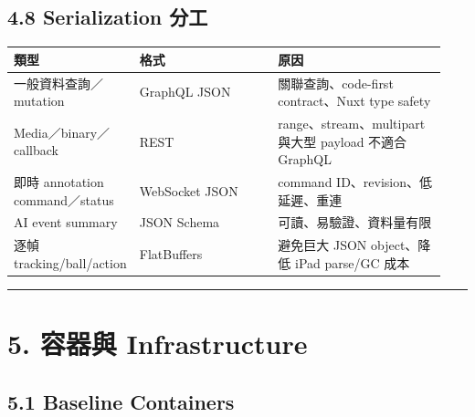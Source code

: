 \documentclass[
  9pt,
  a4paper,
]{article}
\begin{document}
\subsection{4.8 Serialization 分工}\label{48-serialization-ux5206ux5de5}

\begin{longtable}[]{@{}>{\RaggedRight\arraybackslash}p{0.18\linewidth}>{\RaggedRight\arraybackslash}p{0.34\linewidth}>{\RaggedRight\arraybackslash}p{0.42\linewidth}@{}}
\toprule\noalign{}
類型 & 格式 & 原因 \\
\midrule\noalign{}
\endhead
\bottomrule\noalign{}
\endlastfoot
一般資料查詢／mutation & GraphQL JSON & 關聯查詢、code-first
contract、Nuxt type safety \\
Media／binary／callback & REST & range、stream、multipart 與大型 payload
不適合 GraphQL \\
即時 annotation command／status & WebSocket JSON & command
ID、revision、低延遲、重連 \\
AI event summary & JSON Schema & 可讀、易驗證、資料量有限 \\
逐幀 tracking/ball/action & FlatBuffers & 避免巨大 JSON object、降低
iPad parse/GC 成本 \\
\end{longtable}

\begin{center}\rule{0.5\linewidth}{0.5pt}\end{center}

\section{5. 容器與
Infrastructure}\label{5-ux5bb9ux5668ux8207-infrastructure}

\subsection{5.1 Baseline Containers}\label{51-baseline-containers}
\end{document}
